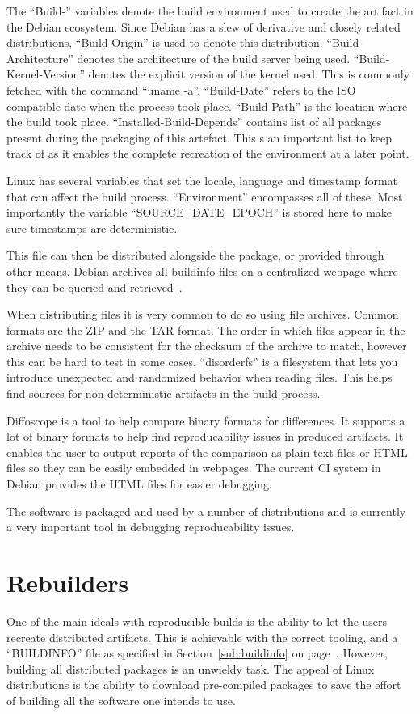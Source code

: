 \documentclass[../Main/thesis.tex]{subfiles}
\begin{document}
The ``Build-'' variables denote the build environment used to create the
artifact in the Debian ecosystem. Since Debian has a slew of derivative and
closely related distributions, ``Build-Origin'' is used to denote this
distribution.  ``Build-Architecture'' denotes the architecture of the build
server being used.  ``Build-Kernel-Version'' denotes the explicit  version of
the kernel used. This is commonly fetched with the command ``uname -a''.
``Build-Date'' refers to the ISO compatible date when the process took place.
``Build-Path'' is the location where the build took place.
``Installed-Build-Depends'' contains list of all packages present during the
packaging of this artefact. This s an important list to keep track of as it
enables the complete recreation of the environment at a later point.

Linux has several variables that set the locale, language and timestamp format
that can affect the build process. ``Environment'' encompasses all of these.
Most importantly the variable ``SOURCE\_DATE\_EPOCH'' is stored here to make
sure timestamps are deterministic.

This file can then be distributed alongside the package, or provided through
other means. Debian archives all buildinfo-files on a centralized webpage where
they can be queried and retrieved~\cite{buildinfo-debian}.

When distributing files it is very common to do so using file archives. Common
formats are the ZIP and the TAR format. The order in which files appear in the
archive needs to be consistent for the checksum of the archive to match, however
this can be hard to test in some cases. ``disorderfs'' is a filesystem that lets
you introduce unexpected and randomized behavior when reading files. This helps
find sources for non-deterministic artifacts in the build process.

Diffoscope is a tool to help compare binary formats for differences. It supports
a lot of binary formats to help find reproducability issues in produced
artifacts. It enables the user to output reports of the comparison as plain text
files or HTML files so they can be easily embedded in webpages. The current CI
system in Debian provides the HTML files for easier debugging.

The software is packaged and used by a number of distributions and is currently
a very important tool in debugging reproducability issues.


\section{Rebuilders}%
\label{sec:rebuilders} 
One of the main ideals with reproducible builds is the ability to let the users
recreate distributed artifacts. This is achievable with the correct tooling, and
a ``BUILDINFO'' file as specified in Section~\ref{sub:buildinfo} on
page~\pageref{sub:buildinfo}. However, building all distributed packages is an
unwieldy task. The appeal of Linux distributions is the ability to download
pre-compiled packages to save the effort of building all the software one
intends to use.
\end{document}
